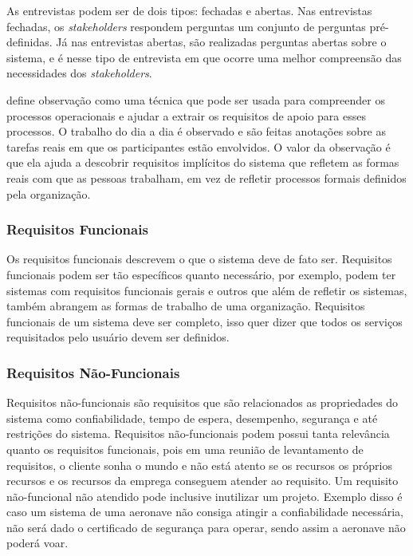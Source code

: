 As entrevistas podem ser de dois tipos: fechadas e abertas. Nas entrevistas fechadas, os \textit{stakeholders} respondem perguntas um conjunto de perguntas pré-definidas. Já nas entrevistas abertas, são realizadas perguntas abertas sobre o sistema, e é nesse tipo de entrevista em que ocorre uma melhor compreensão das necessidades dos \textit{stakeholders}.  

\label{sec:observacao}

\cite{sommerville} define observação como uma técnica que pode ser usada para compreender os processos operacionais e ajudar a extrair os requisitos de apoio para esses processos. O trabalho do dia a dia é observado e são feitas anotações sobre as tarefas reais em que os partici­pantes estão envolvidos. O valor da observação é que ela ajuda a descobrir requisitos implícitos do sistema que refletem as formas reais com que as pessoas trabalham, em vez de refletir processos formais definidos pela organização.

\subsubsection{Requisitos Funcionais}
\label{sec:requisitos_funcionais}

Os requisitos funcionais descrevem o que o sistema deve de fato ser. Requisitos funcionais podem ser tão específicos quanto necessário, por exemplo, podem ter sistemas com requisitos funcionais gerais e outros que além de refletir os sistemas, também abrangem as formas de trabalho de uma organização. Requisitos funcionais de um sistema deve ser completo, isso quer dizer que todos os serviços requisitados pelo usuário devem ser definidos.

\subsubsection{Requisitos Não-Funcionais}
\label{sec:requisitos_nao_funcionais}

Requisitos não-funcionais são requisitos que são relacionados as propriedades do sistema como confiabilidade, tempo de espera, desempenho, segurança e até restrições do sistema. Requisitos não-funcionais podem possui tanta relevância quanto os requisitos funcionais, pois em uma reunião de levantamento de requisitos, o cliente sonha o mundo e não está atento se os recursos os próprios recursos e os recursos da emprega conseguem atender ao requisito. Um requisito não-funcional não atendido pode inclusive inutilizar um projeto. Exemplo disso é caso um sistema de uma aeronave não consiga atingir a confiabilidade necessária, não será dado o certificado de segurança para operar, sendo assim a aeronave não poderá voar.

